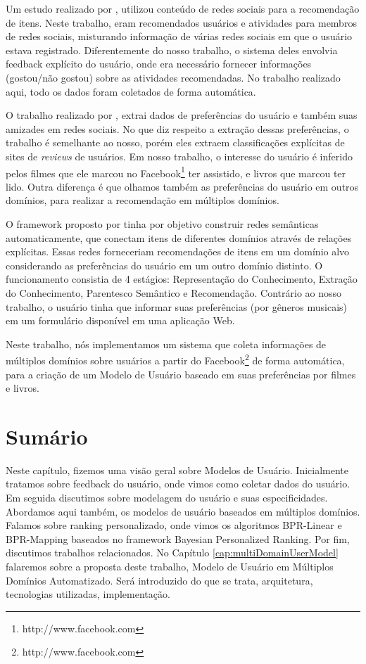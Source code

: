 Um estudo realizado por \cite{Wang2010}, utilizou conteúdo de redes sociais para a recomendação de itens. Neste trabalho, eram recomendados usuários e atividades para membros de redes sociais, misturando informação de várias redes sociais em que o usuário estava registrado. Diferentemente do nosso trabalho, o sistema deles envolvia feedback explícito do usuário, onde era necessário fornecer informações (gostou/não gostou) sobre as atividades recomendadas. No trabalho realizado aqui, todo os dados foram coletados de forma automática.

O trabalho realizado por \cite{Ma:2011:RSS:1935826.1935877}, extrai dados de preferências do usuário e também suas amizades em redes sociais. No que diz respeito a extração dessas preferências, o trabalho é semelhante ao nosso, porém eles extraem classificações explícitas de sites de \textit{reviews} de usuários. Em nosso trabalho, o interesse do usuário é inferido pelos filmes que ele marcou no Facebook\footnote{http://www.facebook.com} ter assistido, e livros que marcou ter lido. Outra diferença é que olhamos também as preferências do usuário em outros domínios, para realizar a recomendação em múltiplos domínios.

O framework proposto por \cite{tobias2013semantic} tinha por objetivo construir redes semânticas automaticamente, que conectam itens de diferentes domínios através de relações explícitas. Essas redes forneceriam recomendações de itens em um domínio alvo considerando as preferências do usuário em um outro domínio distinto. O funcionamento consistia de 4 estágios: Representação do Conhecimento, Extração do Conhecimento, Parentesco Semântico e Recomendação. Contrário ao nosso trabalho, o usuário tinha que informar suas preferências (por gêneros musicais) em um formulário disponível em uma aplicação Web.

Neste trabalho, nós implementamos um sistema que coleta informações de múltiplos domínios sobre usuários a partir do Facebook\footnote{http://www.facebook.com} de forma automática, para a criação de um Modelo de Usuário baseado em suas preferências por filmes e livros.



\section{Sumário}

Neste capítulo, fizemos uma visão geral sobre Modelos de Usuário. Inicialmente tratamos sobre feedback do usuário, onde vimos como coletar dados do usuário. Em seguida discutimos sobre modelagem do usuário e suas especificidades. Abordamos aqui também, os modelos de usuário baseados em múltiplos domínios. Falamos sobre ranking personalizado, onde vimos os algoritmos BPR-Linear e BPR-Mapping baseados no framework Bayesian Personalized Ranking. Por fim, discutimos trabalhos relacionados. No Capítulo \ref{cap:multiDomainUserModel} falaremos sobre a proposta deste trabalho, Modelo de Usuário em Múltiplos Domínios Automatizado. Será introduzido do que se trata, arquitetura, tecnologias utilizadas, implementação.